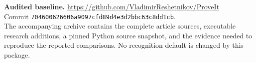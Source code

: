 \documentclass[11pt,a4paper]{article}
\theoremstyle{definition}
\theoremstyle{remark}
\begin{document}
\vfill
{\noindent\small
\textbf{Audited baseline.} \url{https://github.com/VladimirReshetnikov/ProveIt}\\
Commit \texttt{704600626606a9097cfd89d4e3d2bbc63c8dd1cb}.\\
The accompanying archive contains the complete article sources, executable
research additions, a pinned Python source snapshot, and the evidence
needed to reproduce the reported comparisons.  No recognition default is
changed by this package.}
\clearpage
{\small\setlength{\parskip}{0pt}\tableofcontents}
\clearpage











\clearpage


\end{document}
